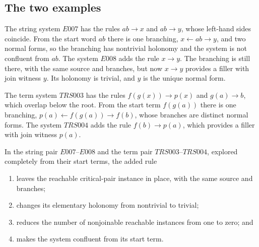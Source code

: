 \subsection{The two examples}
\label{subsec:string-completion-holonomy}
\label{subsec:trs-completion-holonomy}

The string system $E007$ has the rules $ab \to x$ and $ab \to y$, whose left-hand sides coincide. From the start word $ab$ there is one branching, $x \leftarrow ab \to y$, and two normal forms, so the branching has nontrivial holonomy and the system is not confluent from $ab$. The system $E008$ adds the rule $x \to y$. The branching is still there, with the same source and branches, but now $x \to y$ provides a filler with join witness $y$. Its holonomy is trivial, and $y$ is the unique normal form.

The term system $TRS003$ has the rules $f(g(x)) \to p(x)$ and $g(a) \to b$, which overlap below the root. From the start term $f(g(a))$ there is one branching, $p(a) \leftarrow f(g(a)) \to f(b)$, whose branches are distinct normal forms. The system $TRS004$ adds the rule $f(b) \to p(a)$, which provides a filler with join witness $p(a)$.

\begin{table}[t]
    \caption{Before and after the added rule. The number of branchings does not change; the number of nonjoinable ones drops to zero, and confluence from the start term is restored.}
    \label{tab:holonomy-elimination-deltas}
    \centering
    \smallskip
    
\end{table}

\begin{observation}
\label{prop:completion-as-holonomy-elimination}
In the string pair $E007$--$E008$ and the term pair $TRS003$--$TRS004$, explored completely from their start terms, the added rule
\begin{enumerate}
    \item leaves the reachable critical-pair instance in place, with the same source and branches;
    \item changes its elementary holonomy from nontrivial to trivial;
    \item reduces the number of nonjoinable reachable instances from one to zero; and
    \item makes the system confluent from its start term.
\end{enumerate}
\end{observation}

